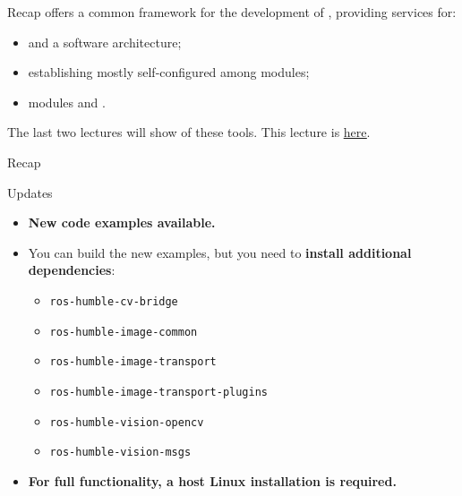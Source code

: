 
\begin{frame}{Recap}
	 offers a common framework for the development of , providing services for:
	\begin{itemize}
		\item {} and  a  software architecture;
		\item establishing mostly self-configured  among modules;
		\item modules  and .
	\end{itemize}
	\vspace{.4cm}
	The last two lectures will show  of these tools.
	\newline\newline
	This lecture is \href{https://github.com/robmasocco/DAFN23_Robotics_5}{\color{blue}\underline{here}}.
\end{frame}
\begin{frame}{Recap}
	\begin{block}{Updates}
		\begin{itemize}
			\item \textbf{New code examples available.}
			\item You can build the new examples, but you need to \textbf{install additional dependencies}:
			      \begin{itemize}
              \item \texttt{ros-humble-cv-bridge}
              \item \texttt{ros-humble-image-common}
              \item \texttt{ros-humble-image-transport}
				      \item \texttt{ros-humble-image-transport-plugins}
				      \item \texttt{ros-humble-vision-opencv}
				      \item \texttt{ros-humble-vision-msgs}
			      \end{itemize}
      \item \textbf{For full functionality, a host Linux installation is required.}
		\end{itemize}
	\end{block}
\end{frame}
